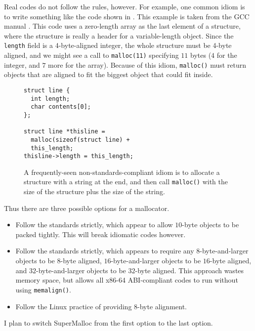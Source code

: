 \documentclass[natbib,sort&compress,10pt]{sigplanconf}
\newcommand{\code}[1]{\texttt{#1}}
\begin{document}
Real codes do not follow the rules, however.  For example, one common
idiom is to write something like the code shown in .
This example is taken from the GCC manual \cite{GCC14}.  This code
uses a zero-length array as the last element of a structure, where the
structure is really a header for a variable-length object.  Since the
\code{length} field is a 4-byte-aligned integer, the whole structure
must be 4-byte aligned, and we might see a call to \code{malloc(11)}
specifying $11$ bytes ($4$ for the integer, and $7$ more for the array).
Because of this idiom, \code{malloc()} must return objects that are
aligned to fit the biggest object that could fit inside.

\begin{figure}
\begin{verbatim}
struct line {
  int length;
  char contents[0];
};

struct line *thisline = 
  malloc(sizeof(struct line) + 
  this_length;
thisline->length = this_length;
\end{verbatim}
\caption{A frequently-seen non-standards-compliant idiom is to
  allocate a structure with a string at the end, and then call
  \code{malloc()} with the size of the structure plus the size of the
  string.}
\label{fig:idiom}
\end{figure}

Thus there are three possible options for a mallocator.
\begin{itemize}
\item Follow the standards strictly, which appear to allow $10$-byte
  objects to be packed tightly.  This will break idiomatic codes
  however.
\item Follow the standards strictly, which appears to require any
  $8$-byte-and-larger objects to be $8$-byte aligned,
  $16$-byte-and-larger objects to be $16$-byte aligned, and 
  $32$-byte-and-larger objects to be $32$-byte aligned.  This approach
  wastes memory space, but allows all x86-64 ABI-compliant codes to
  run without using \code{memalign()}.
\item Follow the Linux practice of providing 8-byte alignment.
\end{itemize}
I plan to switch SuperMalloc from the first option to the last option.

\end{document}
